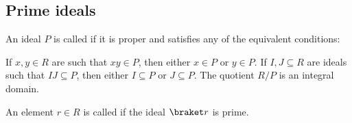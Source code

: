 \subsection{Prime ideals}\label{subsec:prime_ideals}

\begin{definition}\label{def:prime_ring_ideal}\mcite\cite[384]{Knapp2016BAlg}
  An ideal \( P \) is called  if it is proper and satisfies any of the equivalent conditions:
  \begin{defenum}
     If \( x, y \in R \) are such that \( xy \in P \), then either \( x \in P \) or \( y \in P \).
     If \( I, J \subseteq R \) are ideals such that \( IJ \subseteq P \), then either \( I \subseteq P \) or \( J \subseteq P \).
     The quotient \( R / P \) is an integral domain.
  \end{defenum}

  An element \( r \in R \) is called  if the ideal \( \braket r \) is prime.
\end{definition}
